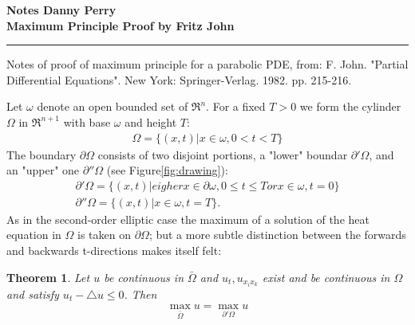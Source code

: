 \documentclass[11pt]{article}
\begin{document}
\thispagestyle{empty}
{\large{\bf Notes \hfill Danny Perry}}\\

{\LARGE{\bf Maximum Principle Proof by Fritz John}}
\vspace{0.2\baselineskip}
\hrule

Notes of proof of maximum principle for a parabolic PDE, from: F. John. "Partial Differential Equations".  New York: Springer-Verlag. 1982. pp. 215-216.


Let $\omega$ denote an open bounded set of $\Re^n$.  For a fixed $T>0$ we form the cylinder $\Omega$ in $\Re^{n+1}$ with base $\omega$ and height $T$:
\begin{align}
\Omega = \{(x,t)|x \in \omega, 0 < t < T \}
\end{align}
The boundary $\partial \Omega$ consists of two disjoint portions, a "lower" boundar $\partial'\Omega$, and an "upper" one $\partial''\Omega$ (see Figure\ref{fig:drawing}):
\begin{align}
\partial'\Omega = \{(x,t)|eigher x \in \partial \omega, 0 \le t \le T or x \in \omega, t=0\} \\
\partial''\Omega = \{(x,t)|x \in \omega, t=T\}.
\end{align}
As in the second-order elliptic case the maximum of a solution of the heat equation in $\Omega$ is taken on $\partial \Omega$; but a more subtle distinction between the forwards and backwards t-directions makes itself felt:

\newtheorem{maxthrm}{Theorem}
\begin{maxthrm}
Let $u$ be continuous in $\bar{\Omega}$ and $u_t,u_{x_ix_k}$ exist and be continuous in $\Omega$ and satisfy $u_t-\triangle u \le 0$. Then
\begin{align}
\max_{\bar{\Omega}} u = \max_{\partial ' \Omega} u \label{eqn:thrm}
\end{align}
\end{maxthrm}
\end{document}
